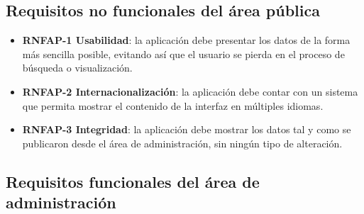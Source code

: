 \documentclass[
]{article}
\providecommand{\tightlist}{%
  \setlength{\itemsep}{0pt}\setlength{\parskip}{0pt}}
\begin{document}
\hypertarget{requisitos-no-funcionales-del-uxe1rea-puxfablica}{%
\subsection{Requisitos no funcionales del área
pública}\label{requisitos-no-funcionales-del-uxe1rea-puxfablica}}

\begin{itemize}
\tightlist
\item
  \textbf{RNFAP-1 Usabilidad}: la aplicación debe presentar los datos de
  la forma más sencilla posible, evitando así que el usuario se pierda
  en el proceso de búsqueda o visualización.
\item
  \textbf{RNFAP-2 Internacionalización}: la aplicación debe contar con
  un sistema que permita mostrar el contenido de la interfaz en
  múltiples idiomas.
\item
  \textbf{RNFAP-3 Integridad}: la aplicación debe mostrar los datos tal
  y como se publicaron desde el área de administración, sin ningún tipo
  de alteración.
\end{itemize}

\hypertarget{requisitos-funcionales-del-uxe1rea-de-administraciuxf3n}{%
\subsection{Requisitos funcionales del área de
administración}\label{requisitos-funcionales-del-uxe1rea-de-administraciuxf3n}}
\end{document}
